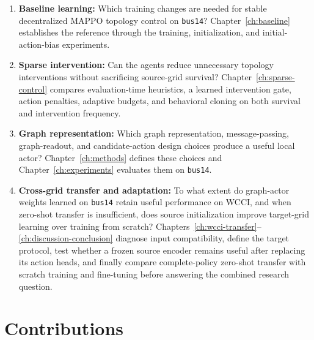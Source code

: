 \begin{enumerate}
  \item \textbf{Baseline learning:} Which training changes are needed for
  stable decentralized MAPPO topology control on \texttt{bus14}?
  Chapter~\ref{ch:baseline} establishes the reference through the training,
  initialization, and initial-action-bias experiments.

  \item \textbf{Sparse intervention:} Can the agents reduce unnecessary
  topology interventions without sacrificing source-grid survival?
  Chapter~\ref{ch:sparse-control} compares evaluation-time heuristics, a
  learned intervention gate, action penalties, adaptive budgets, and behavioral
  cloning on both survival and intervention frequency.

  \item \textbf{Graph representation:} Which graph representation,
  message-passing, graph-readout, and candidate-action design choices produce a
  useful local actor? Chapter~\ref{ch:methods} defines these choices and
  Chapter~\ref{ch:experiments} evaluates them on \texttt{bus14}.

  \newpage
  \item \textbf{Cross-grid transfer and adaptation:} To what extent do
  graph-actor weights learned on \texttt{bus14} retain useful performance on
  WCCI, and when zero-shot transfer is insufficient, does source initialization
  improve target-grid learning over training from scratch?
  {\color{red}Chapters~\ref{ch:wcci-transfer}--\ref{ch:discussion-conclusion}
  diagnose input compatibility, define the target protocol, test whether a
  frozen source encoder remains useful after replacing its action heads, and
  finally compare complete-policy zero-shot transfer with scratch training and
  fine-tuning before answering the combined research question.}
\end{enumerate}

\section{Contributions}
\label{sec:plan-contributions}

